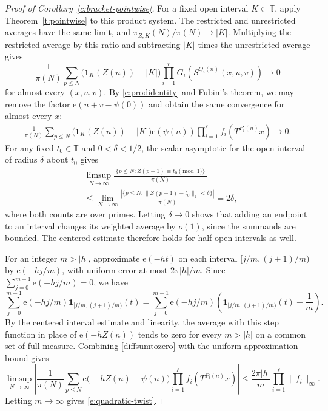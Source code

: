\documentclass[12pt]{amsart}
\newcommand{\1}{\mathbf 1}
\newcommand{\e}{\mathrm e}
\theoremstyle{definition}
\begin{document}
\begin{proof}[Proof of Corollary~\ref{c:bracket-pointwise}]
For a fixed open interval $K\subset\mathbb T$, apply
Theorem~\ref{t:pointwise} to this product system. The restricted
and unrestricted averages have the same limit, and
$\pi_{Z,K}(N)/\pi(N)\to |K|$. Multiplying the restricted average
by this ratio and subtracting $|K|$ times the unrestricted
average gives
\[
 \frac1{\pi(N)}\sum_{p\leq N}
 \bigl(\mathbf1_K(Z(n))-|K|\bigr)
 \prod_{i=1}^{r}G_i(S^{Q_i(n)}(x,u,v))
 \longrightarrow 0
\]
for almost every $(x,u,v)$. By \eqref{e:prodidentity} and
Fubini's theorem, we may remove the factor
$\e(u+v-\psi(0))$ and obtain the same convergence for almost
every $x$:
\begin{align}\label{diffsumtozero}
    \frac1{\pi(N)}\sum_{p\leq N}
 \bigl(\mathbf1_K(Z(n))-|K|\bigr)\e(\psi(n))
 \prod_{i=1}^{\ell}f_i(T^{P_i(n)}x)
 \longrightarrow 0 .
\end{align}
For any fixed $t_0\in\mathbb T$ and $0<\delta<1/2$, the scalar
asymptotic for the open interval of radius $\delta$ about $t_0$
gives
\begin{align*}
   & \limsup_{N\to\infty}
 \frac{|\{p\leq N: Z(p-1)\equiv t_0\pmod 1\}|}{\pi(N)}\\
 &\leq
 \lim_{N\to\infty}
 \frac{|\{p\leq N:\|Z(p-1)-t_0\|_{\mathbb T}<\delta\}|}{\pi(N)}
 =2\delta,
\end{align*}
where both counts are over primes. Letting $\delta\to0$ shows
that adding an endpoint to an interval changes its weighted
average by $o(1)$, since the summands are bounded. The centered
estimate therefore holds for half-open intervals as well.

For an integer $m>|h|$, approximate $\e(-ht)$ on each interval
$[j/m,(j+1)/m)$ by $\e(-hj/m)$, with uniform error at most
$2\pi|h|/m$. Since $\sum_{j=0}^{m-1}\e(-hj/m)=0$, we have
\[
 \sum_{j=0}^{m-1}\e(-hj/m)\mathbf1_{[j/m,(j+1)/m)}(t)
 =
 \sum_{j=0}^{m-1}\e(-hj/m)
 \left(\mathbf1_{[j/m,(j+1)/m)}(t)-\frac1m\right).
\]
By the centered interval estimate and linearity, the average
with this step function in place of $\e(-hZ(n))$ tends to zero
for every $m>|h|$ on a common set of full measure. Combining \eqref{diffsumtozero} with the uniform approximation
bound gives
\[
 \limsup_{N\to\infty}
 \left|
 \frac1{\pi(N)}\sum_{p\leq N}
 \e\bigl(-hZ(n)+\psi(n)\bigr)
 \prod_{i=1}^{\ell}f_i(T^{P_i(n)}x)
 \right|
 \leq \frac{2\pi|h|}{m}\prod_{i=1}^{\ell}\|f_i\|_\infty.
\]
Letting $m\to\infty$ gives \eqref{e:quadratic-twist}.


\end{proof}
\end{document}
